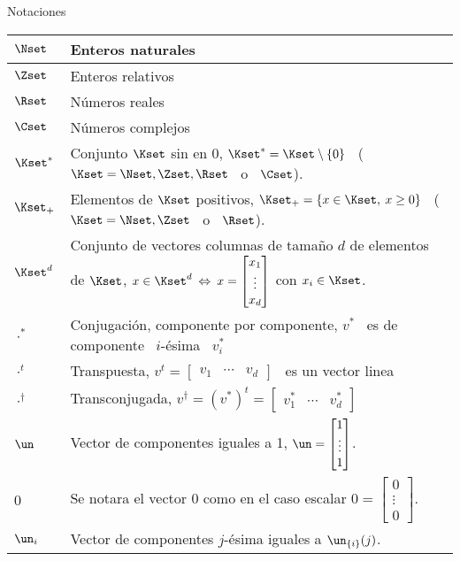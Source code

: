 \begin{preliminar}{Notaciones}

\begin{center}
\begin{tabular}
{
|>{\vspace{-2mm}}p{}|
>{\vspace{-2mm}\hspace{2mm}}p{}|
}
\hline
%
$\Nset$ & Enteros naturales\\[2mm]
\hline
%
$\Zset$ & Enteros relativos\\[2mm]
\hline
%
%
$\Rset$ & N\'umeros reales\\[2mm]
\hline
%
$\Cset$ & N\'umeros complejos\\[2mm]
\hline
%
$\Kset^*$ & Conjunto $\Kset$ sin en $0$,  $\Kset^* = \Kset \setminus \{ 0 \}$ \ ($\Kset = \Nset, \Zset, \Rset$ \ o \ $\Cset$).\\[2mm]
\hline
%
$\Kset_+$ & Elementos de $\Kset$ positivos, $\Kset_+ = \{ x \in \Kset, \: x \ge 0 \}$ \ ($\Kset = \Nset, \Zset$ \ o \ $\Rset$).\\[2mm]
\hline
%
$\Kset^d$ & Conjunto de vectores columnas de tama\~no $d$ de elementos de $\Kset$, $x \in \Kset^d \: \Leftrightarrow \: x = \begin{bmatrix} x_1\\ \vdots \\ x_d \end{bmatrix}$ con $x_i \in \Kset$.\\[2mm]
\hline
%
$\cdot^*$ & Conjugaci\'on, componente por componente, $v^*$ \ es de componente \ $i$-\'esima \ $v_i^*$\\[2mm]
\hline
%
$\cdot^t$ & Transpuesta, $v^t = \begin{bmatrix} v_1 & \cdots & v_d\end{bmatrix}$ \ es un vector linea\\[2mm]
\hline
%
$\cdot^\dag$ & Transconjugada, $v^\dag = \left( v^* \right)^t = \begin{bmatrix} v_1^* & \cdots & v_d^*\end{bmatrix}$\\[2mm]
\hline
%
$\un$ & Vector de componentes iguales a 1,  $\un = \begin{bmatrix} 1\\ \vdots \\ 1 \end{bmatrix}$.\\[2mm]
\hline
%
$0$ & Se notara el vector 0 como en el caso escalar $0 = \begin{bmatrix} 0\\ \vdots \\ 0 \end{bmatrix}$.\\[2mm]
\hline
%
$\un_i$ & Vector de componentes $j$-\'esima iguales a $\un_{\{i\}}(j)$.\\[2mm]
\hline
\end{tabular}
\end{center}


\end{preliminar}
